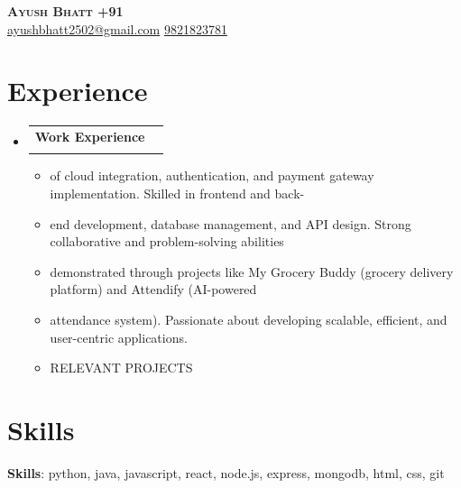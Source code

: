 \documentclass[letterpaper,11pt]{article}
\makeatletter
\newcommand{\resumeItem}[1]{
  \item\small{
    {#1 \vspace{-2pt}}
  }
}
\newcommand{\resumeSubheading}[4]{
  \vspace{-2pt}\item
    \begin{tabular*}{0.97\textwidth}[t]{l@{\extracolsep{\fill}}r}
      \textbf{#1} & #2 \\
      \textit{\small#3} & \textit{\small #4} \\
    \end{tabular*}\vspace{-7pt}
}
\newcommand{\resumeSubHeadingListStart}{\begin{itemize}[leftmargin=0.15in, label={}]}
\newcommand{\resumeSubHeadingListEnd}{\end{itemize}}
\newcommand{\resumeItemListStart}{\begin{itemize}}
\newcommand{\resumeItemListEnd}{\end{itemize}\vspace{-8pt}}
\makeatother
\begin{document}
\begin{center}
    \textbf{\Huge \scshape Ayush Bhatt
+91} \\ \vspace{8pt}
    \small 
    \href{mailto:ayushbhatt2502@gmail.com}{\color{black}ayushbhatt2502@gmail.com} \hspace{5px}
    \href{tel:9821823781}{\color{black}9821823781}
\end{center}

\vspace{-8pt}

\section{Experience}
  \resumeSubHeadingListStart

   \resumeSubheading
    {Work Experience}{}
    {}{}
    \resumeItemListStart
        \resumeItem{of cloud integration, authentication, and payment gateway implementation. Skilled in frontend and back-}
        \resumeItem{end development, database management, and API design. Strong collaborative and problem-solving abilities}
        \resumeItem{demonstrated through projects like My Grocery Buddy (grocery delivery platform) and Attendify (AI-powered}
        \resumeItem{attendance system). Passionate about developing scalable, efficient, and user-centric applications.}
        \resumeItem{RELEVANT PROJECTS}
    \resumeItemListEnd

  \resumeSubHeadingListEnd

\section{Skills}
 \begin{itemize}[leftmargin=0.15in, label={}]
    \small{\item{
     \textbf{Skills}{: python, java, javascript, react, node.js, express, mongodb, html, css, git}  %
    }}
 \end{itemize}
\end{document}
